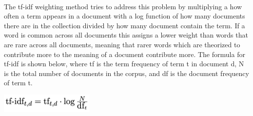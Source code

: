 \\
The tf-idf weighting method tries to address this problem by multiplying a how often a term appears in a document with a log function of how many documents there are in the collection divided by how many document contain the term. If a word is common across all documents this assigns a lower weight than words that are rare across all documents, meaning that rarer words which are theorized to contribute more to the meaning of a document contribute more. The formula for tf-idf is shown below, where tf is the term frequency of term t in document d, N is the total number of documents in the corpus, and df is the document frequency of term t.
\\
\begin{center}
	\includegraphics[width=0.35\textwidth]{tf-idf.png}
\end{center}

